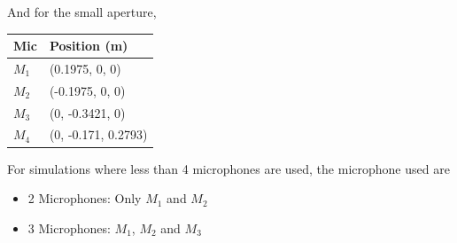 And for the small aperture,
\begin{table}[H]
\centering
    \begin{tabular}{ll} \toprule
	{Mic}	&	{Position (m)}\\
	    \bottomrule 
     $M_1$   &   (0.1975, 0, 0) \\
     $M_2$   &   (-0.1975, 0, 0)\\
     $M_3$   &   (0, -0.3421, 0)\\
     $M_4$   &   (0, -0.171, 0.2793) \\	\bottomrule 
	\end{tabular}
\end{table}
For simulations where less than 4 microphones are used, the microphone used are
\begin{itemize}
    \item 2 Microphones: Only $M_1$ and $M_2$
    \item 3 Microphones: $M_1$, $M_2$ and $M_3$
\end{itemize}